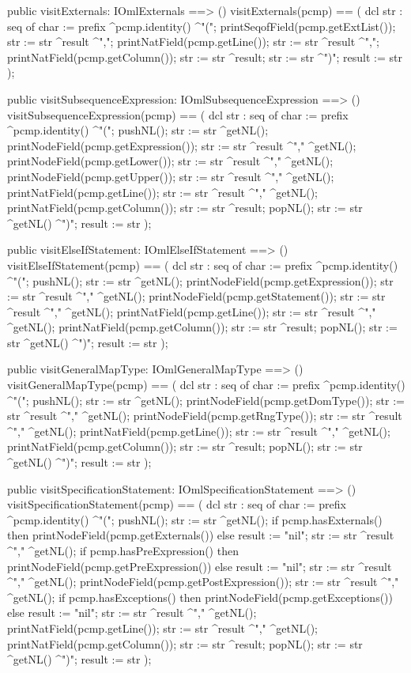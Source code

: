 \begin{vdm_al}
  public visitExternals: IOmlExternals ==> ()
  visitExternals(pcmp) ==
    ( dcl str : seq of char := prefix ^pcmp.identity() ^"(";
      printSeqofField(pcmp.getExtList());
      str := str ^result ^",";
      printNatField(pcmp.getLine());
      str := str ^result ^",";
      printNatField(pcmp.getColumn());
      str := str ^result;
      str := str ^")";
      result := str );

  public visitSubsequenceExpression: IOmlSubsequenceExpression ==> ()
  visitSubsequenceExpression(pcmp) ==
    ( dcl str : seq of char := prefix ^pcmp.identity() ^"(";
      pushNL();
      str := str ^getNL();
      printNodeField(pcmp.getExpression());
      str := str ^result ^"," ^getNL();
      printNodeField(pcmp.getLower());
      str := str ^result ^"," ^getNL();
      printNodeField(pcmp.getUpper());
      str := str ^result ^"," ^getNL();
      printNatField(pcmp.getLine());
      str := str ^result ^"," ^getNL();
      printNatField(pcmp.getColumn());
      str := str ^result;
      popNL();
      str := str ^getNL() ^")";
      result := str );

  public visitElseIfStatement: IOmlElseIfStatement ==> ()
  visitElseIfStatement(pcmp) ==
    ( dcl str : seq of char := prefix ^pcmp.identity() ^"(";
      pushNL();
      str := str ^getNL();
      printNodeField(pcmp.getExpression());
      str := str ^result ^"," ^getNL();
      printNodeField(pcmp.getStatement());
      str := str ^result ^"," ^getNL();
      printNatField(pcmp.getLine());
      str := str ^result ^"," ^getNL();
      printNatField(pcmp.getColumn());
      str := str ^result;
      popNL();
      str := str ^getNL() ^")";
      result := str );

  public visitGeneralMapType: IOmlGeneralMapType ==> ()
  visitGeneralMapType(pcmp) ==
    ( dcl str : seq of char := prefix ^pcmp.identity() ^"(";
      pushNL();
      str := str ^getNL();
      printNodeField(pcmp.getDomType());
      str := str ^result ^"," ^getNL();
      printNodeField(pcmp.getRngType());
      str := str ^result ^"," ^getNL();
      printNatField(pcmp.getLine());
      str := str ^result ^"," ^getNL();
      printNatField(pcmp.getColumn());
      str := str ^result;
      popNL();
      str := str ^getNL() ^")";
      result := str );

  public visitSpecificationStatement: IOmlSpecificationStatement ==> ()
  visitSpecificationStatement(pcmp) ==
    ( dcl str : seq of char := prefix ^pcmp.identity() ^"(";
      pushNL();
      str := str ^getNL();
      if pcmp.hasExternals()
      then printNodeField(pcmp.getExternals())
      else result := "nil";
      str := str ^result ^"," ^getNL();
      if pcmp.hasPreExpression()
      then printNodeField(pcmp.getPreExpression())
      else result := "nil";
      str := str ^result ^"," ^getNL();
      printNodeField(pcmp.getPostExpression());
      str := str ^result ^"," ^getNL();
      if pcmp.hasExceptions()
      then printNodeField(pcmp.getExceptions())
      else result := "nil";
      str := str ^result ^"," ^getNL();
      printNatField(pcmp.getLine());
      str := str ^result ^"," ^getNL();
      printNatField(pcmp.getColumn());
      str := str ^result;
      popNL();
      str := str ^getNL() ^")";
      result := str );


\end{vdm_al}
